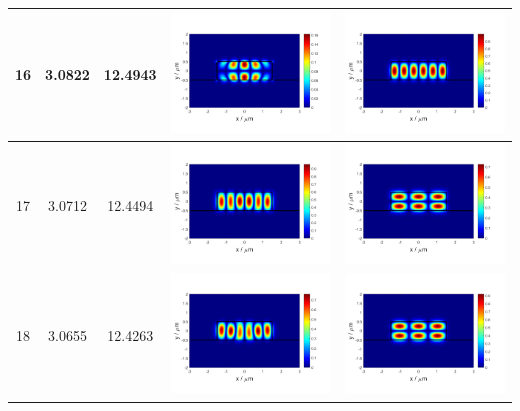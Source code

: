 \documentclass{assignment}
\begin{document}
\begin{sol}
\begin{itemize}
\begin{longtable}[c]{|c|c|c|c|c|}
            16 & 3.0822 & 12.4943 & \includegraphics[width=.3\columnwidth]{Assignment-2-mode-16-Ex.png} & \includegraphics[width=.3\columnwidth]{Assignment-2-mode-16-Ey.png} \\ \hline
            17 & 3.0712 & 12.4494 & \includegraphics[width=.3\columnwidth]{Assignment-2-mode-17-Ex.png} & \includegraphics[width=.3\columnwidth]{Assignment-2-mode-17-Ey.png} \\ \hline
            18 & 3.0655 & 12.4263 & \includegraphics[width=.3\columnwidth]{Assignment-2-mode-18-Ex.png} & \includegraphics[width=.3\columnwidth]{Assignment-2-mode-18-Ey.png} \\ \hline

\end{longtable}
\end{itemize}
\end{sol}
\end{document}
